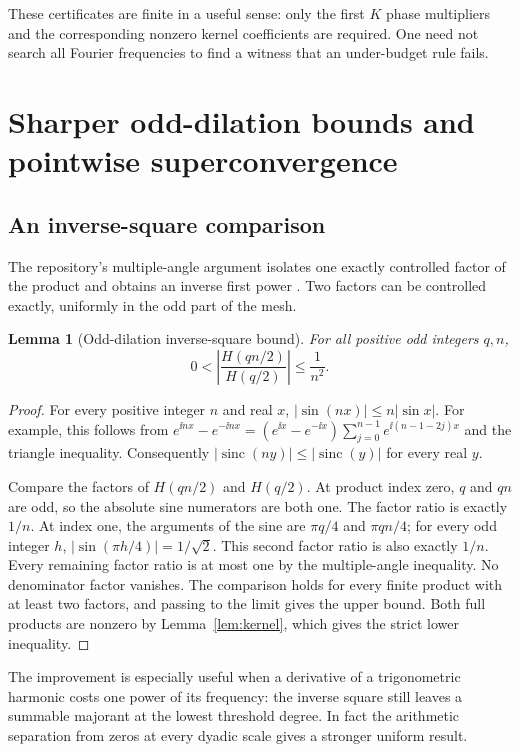 \documentclass[11pt,a4paper]{article}
\numberwithin{equation}{section}
\newtheorem{lemma}[theorem]{Lemma}
\theoremstyle{definition}
\theoremstyle{remark}
\newcommand{\sinc}{\operatorname{sinc}}
\begin{document}
These certificates are finite in a useful sense: only the first $K$
phase multipliers and the corresponding nonzero kernel coefficients
are required. One need not search all Fourier frequencies to find a
witness that an under-budget rule fails.

\section{Sharper odd-dilation bounds and pointwise superconvergence}

\subsection{An inverse-square comparison}

The repository's multiple-angle argument isolates one exactly controlled
factor of the product and obtains an inverse first power
\cite{repoComb}. Two factors can be controlled exactly, uniformly in the
odd part of the mesh.

\begin{lemma}[Odd-dilation inverse-square bound]
\label{lem:dilation}
For all positive odd integers $q,n$,
\begin{equation}
 0<\left|\frac{H(qn/2)}{H(q/2)}\right|\le\frac1{n^2}.
 \label{eq:dilation}
\end{equation}
\end{lemma}
\begin{proof}
For every positive integer $n$ and real $x$,
$|\sin(nx)|\le n|\sin x|$. For example, this follows from
$e^{\ii nx}-e^{-\ii nx}=(e^{\ii x}-e^{-\ii x})
\sum_{j=0}^{n-1}e^{\ii(n-1-2j)x}$ and the triangle inequality.
Consequently $|\sinc(ny)|\le|\sinc(y)|$ for every real $y$.

Compare the factors of $H(qn/2)$ and $H(q/2)$.
At product index zero, $q$ and $qn$ are odd, so the absolute sine
numerators are both one. The factor ratio is exactly $1/n$.
At index one, the arguments of the sine are $\pi q/4$ and $\pi qn/4$;
for every odd integer $h$, $|\sin(\pi h/4)|=1/\sqrt2$.
This second factor ratio is also exactly $1/n$.
Every remaining factor ratio is at most one by the multiple-angle
inequality. No denominator factor vanishes. The comparison holds for
every finite product with at least two factors, and passing to the limit
gives the upper bound. Both full products are nonzero by
Lemma~\ref{lem:kernel}, which gives the strict lower inequality.
\end{proof}

The improvement is especially useful when a derivative of a trigonometric
harmonic costs one power of its frequency: the inverse square still leaves
a summable majorant at the lowest threshold degree. In fact the arithmetic
separation from zeros at every dyadic scale gives a stronger uniform result.
\end{document}

